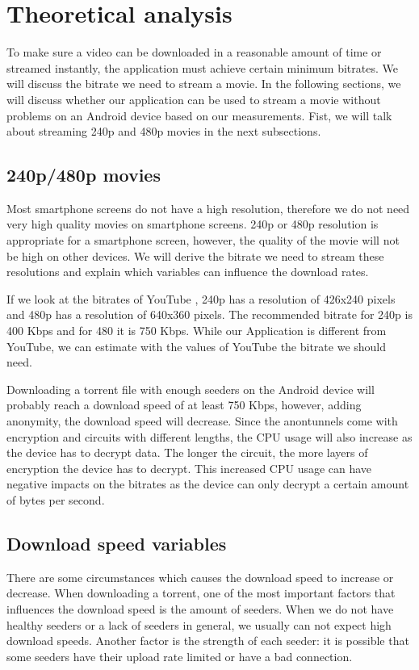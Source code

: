\section{Theoretical analysis}
	To make sure a video can be downloaded in a reasonable amount of time or streamed instantly, the application must achieve certain minimum bitrates. We will discuss the bitrate we need to stream a movie. In the following sections, we will discuss whether our application can be used to stream a movie without problems on an Android device based on our measurements. Fist, we will talk about streaming 240p and 480p movies in the next subsections.
	
	\subsection{240p/480p movies}
		Most smartphone screens do not have a high resolution, therefore we do not need very high quality movies on smartphone screens. 240p or 480p resolution is appropriate for a smartphone screen, however, the quality of the movie will not be high on other devices. We will derive the bitrate we need to stream these resolutions and explain which variables can influence the download rates.
		
		If we look at the bitrates of YouTube \cite{googlebitrates}, 240p has a resolution of 426x240 pixels and 480p has a resolution of 640x360 pixels. The recommended bitrate for 240p is 400 Kbps and for 480 it is 750 Kbps. While our Application is different from YouTube, we can estimate with the values of YouTube the bitrate we should need.
		
		Downloading a torrent file with enough seeders on the Android device will probably reach a download speed of at least 750 Kbps, however, adding anonymity, the download speed will decrease. Since the anontunnels come with  encryption and circuits with different lengths, the CPU usage will also increase as the device has to decrypt data. The longer the circuit, the more layers of encryption the device has to decrypt. This increased CPU usage
		can have negative impacts on the bitrates as the device can only decrypt a certain amount of bytes per second.
		
	\subsection{Download speed variables}
		There are some circumstances which causes the download speed to increase or decrease. When downloading a torrent, one of the most important factors that influences the download speed is the amount of seeders. When we do not have healthy seeders or a lack of seeders in general, we usually can not expect high download speeds. Another factor is the strength of each seeder: it is possible that some seeders have their upload rate limited or have a bad connection.
		

